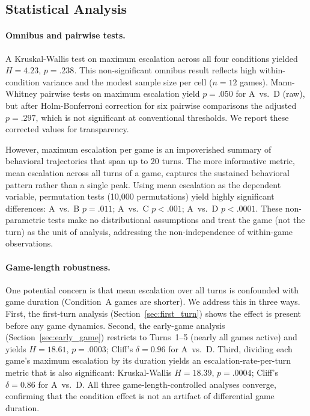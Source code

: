\documentclass[manuscript, review=true, anonymous=true]{acmart}
\begin{document}
\subsection{Statistical Analysis}

\paragraph{Omnibus and pairwise tests.}
A Kruskal-Wallis test on maximum escalation across all four conditions yielded $H = 4.23$, $p = .238$.
This non-significant omnibus result reflects high within-condition variance and the modest sample size per cell ($n = 12$ games).
Mann-Whitney pairwise tests on maximum escalation yield $p = .050$ for A~vs.~D (raw), but after Holm-Bonferroni correction for six pairwise comparisons the adjusted $p = .297$, which is not significant at conventional thresholds.
We report these corrected values for transparency.

However, maximum escalation per game is an impoverished summary of behavioral trajectories that span up to 20 turns.
The more informative metric, mean escalation across all turns of a game, captures the sustained behavioral pattern rather than a single peak.
Using mean escalation as the dependent variable, permutation tests (10{,}000 permutations) yield highly significant differences: A~vs.~B $p = .011$; A~vs.~C $p < .001$; A~vs.~D $p < .0001$.
These non-parametric tests make no distributional assumptions and treat the game (not the turn) as the unit of analysis, addressing the non-independence of within-game observations.

\paragraph{Game-length robustness.}
One potential concern is that mean escalation over all turns is confounded with game duration (Condition~A games are shorter).
We address this in three ways.
First, the first-turn analysis (Section~\ref{sec:first_turn}) shows the effect is present before any game dynamics.
Second, the early-game analysis (Section~\ref{sec:early_game}) restricts to Turns~1--5 (nearly all games active) and yields $H = 18.61$, $p = .0003$; Cliff's $\delta = 0.96$ for A~vs.~D.
Third, dividing each game's maximum escalation by its duration yields an escalation-rate-per-turn metric that is also significant: Kruskal-Wallis $H = 18.39$, $p = .0004$; Cliff's $\delta = 0.86$ for A~vs.~D.
All three game-length-controlled analyses converge, confirming that the condition effect is not an artifact of differential game duration.
\end{document}
